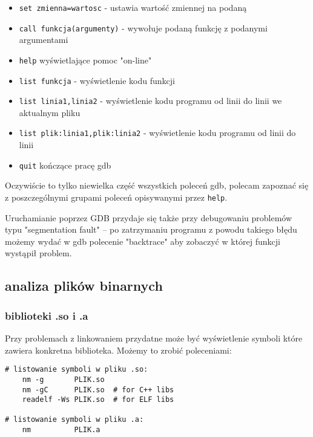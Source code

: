 \begin{itemize}
	\item\Verb$set zmienna=wartosc$ - ustawia wartość zmiennej na podaną
	\item\Verb$call funkcja(argumenty)$ - wywołuje podaną funkcję z podanymi argumentami
\vspace{6pt}
	\item\Verb$help$ wyświetlające pomoc "on-line"
	\item\Verb$list funkcja$ - wyświetlenie kodu funkcji
	\item\Verb$list linia1,linia2$ - wyświetlenie kodu programu od linii do linii we aktualnym pliku
	\item\Verb$list plik:linia1,plik:linia2$ - wyświetlenie kodu programu od linii do linii
	\item\Verb$quit$ kończące pracę gdb
\end{itemize}

Oczywiście to tylko niewielka część wszystkich poleceń gdb, polecam zapoznać się z poszczególnymi grupami poleceń opisywanymi przez \Verb$help$.

Uruchamianie poprzez GDB przydaje się także przy debugowaniu problemów typu "segmentation fault" – po zatrzymaniu programu z powodu takiego błędu możemy wydać w gdb polecenie "backtrace" aby zobaczyć w której funkcji wystąpił problem.

\subsection{analiza plików binarnych}

\subsubsection{biblioteki .so i .a}

Przy problemach z linkowaniem przydatne może być wyświetlenie symboli które zawiera konkretna biblioteka. Możemy to zrobić poleceniami:

\begin{Verbatim}
# listowanie symboli w pliku .so:
	nm -g       PLIK.so
	nm -gC      PLIK.so  # for C++ libs
	readelf -Ws PLIK.so  # for ELF libs

# listowanie symboli w pliku .a:
	nm          PLIK.a
\end{Verbatim}
